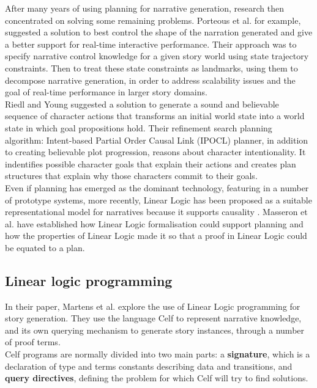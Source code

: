 \documentclass[11pt]{article}
\begin{document}
After many years of using planning for narrative generation, research then concentrated on solving some remaining problems. Porteous et al. \cite{Porteous10} for example, suggested a solution to best control the shape of the narration generated and give a better support for real-time interactive performance. Their approach was to specify narrative control knowledge for a given story world using state trajectory constraints. Then to treat these state constraints as landmarks, using them to decompose narrative generation, in order to address scalability issues and the goal of real-time performance in larger story domains.\\

Riedl and Young \cite{Riedl10} suggested a solution to generate a sound and believable sequence of character actions that transforms an initial world state into a world state in which goal propositions hold. Their refinement search planning algorithm: Intent-based Partial Order Causal Link (IPOCL) planner, in addition to creating believable plot progression, reasons about character intentionality. It indentifies possible character goals that explain their actions and creates plan structures that explain why those characters commit to their goals.\\

Even if planning has emerged as the dominant technology, featuring in a number of prototype systems, more recently, Linear Logic has been proposed as a suitable representational model for narratives because it supports causality \cite{Bosser10}. Masseron et al. \cite{Masseron93} have established how Linear Logic formalisation could support planning and how the properties of Linear Logic made it so that a proof in Linear Logic could be equated to a plan.
\subsection{Linear logic programming}
In their paper, Martens et al. \cite{Martens13} explore the use of Linear Logic programming for story generation. They use the language Celf \cite{Schack08} to represent narrative knowledge, and its own querying mechanism to generate story instances, through a number of proof terms.\\

Celf programs are normally divided into two main parts: a \textbf{signature}, which is a declaration of type and terms constants describing data and transitions, and \textbf{query directives}, defining the problem for which Celf will try to find solutions.\\
\end{document}
